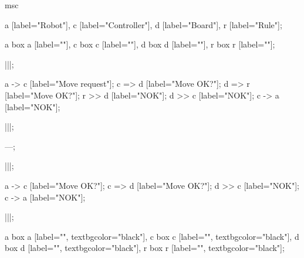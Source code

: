 \begin{msc}
msc
{

a [label="Robot"],
c [label="Controller"],
d [label="Board"],
r [label="Rule"];

a box a [label=""],
c box c [label=""],
d box d [label=""],
r box r [label=""];

|||;

a -> c [label="Move request"];
c => d [label="Move OK?"];
d => r [label="Move OK?"];
r >> d [label="NOK"];
d >> c [label="NOK"];
c -> a [label="NOK"];

|||;

---;

|||;

a -> c [label="Move OK?"];
c => d [label="Move OK?"];
d >> c [label="NOK"];
c -> a [label="NOK"];

|||;

a box a [label="", textbgcolor="black"],
c box c [label="", textbgcolor="black"],
d box d [label="", textbgcolor="black"],
r box r [label="", textbgcolor="black"];

}
\end{msc}
